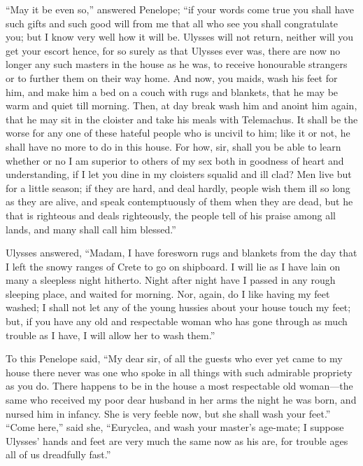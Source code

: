 “May it be even so,” answered Penelope; “if your words come true you shall have
such gifts and such good will from me that all who see you shall congratulate
you; but I know very well how it will be. Ulysses will not return, neither will
you get your escort hence, for so surely as that Ulysses ever was, there are
now no longer any such masters in the house as he was, to receive honourable
strangers or to further them on their way home. And now, you maids, wash his
feet for him, and make him a bed on a couch with rugs and blankets, that he may
be warm and quiet till morning. Then, at day break wash him and anoint him
again, that he may sit in the cloister and take his meals with Telemachus. It
shall be the worse for any one of these hateful people who is uncivil to him;
like it or not, he shall have no more to do in this house. For how, sir, shall
you be able to learn whether or no I am superior to others of my sex both in
goodness of heart and understanding, if I let you dine in my cloisters squalid
and ill clad? Men live but for a little season; if they are hard, and deal
hardly, people wish them ill so long as they are alive, and speak
contemptuously of them when they are dead, but he that is righteous and deals
righteously, the people tell of his praise among all lands, and many shall call
him blessed.”

Ulysses answered, “Madam, I have foresworn rugs and blankets from the day that
I left the snowy ranges of Crete to go on shipboard. I will lie as I have lain
on many a sleepless night hitherto. Night after night have I passed in any
rough sleeping place, and waited for morning. Nor, again, do I like having my
feet washed; I shall not let any of the young hussies about your house touch my
feet; but, if you have any old and respectable woman who has gone through as
much trouble as I have, I will allow her to wash them.”

To this Penelope said, “My dear sir, of all the guests who ever yet came to my
house there never was one who spoke in all things with such admirable propriety
as you do. There happens to be in the house a most respectable old woman—the
same who received my poor dear husband in her arms the night he was born, and
nursed him in infancy. She is very feeble now, but she shall wash your feet.”
“Come here,” said she, “Euryclea, and wash your master’s age-mate; I suppose
Ulysses’ hands and feet are very much the same now as his are, for trouble ages
all of us dreadfully fast.”

